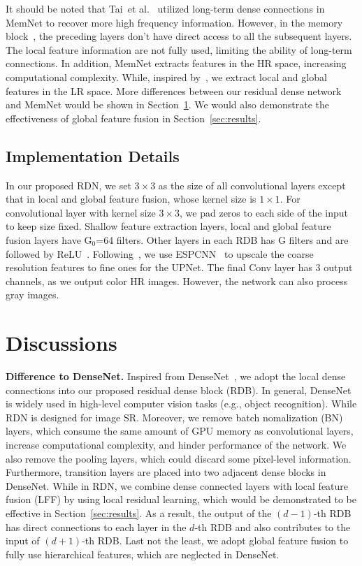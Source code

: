 \documentclass[10pt,twocolumn,letterpaper]{article}
\begin{document}
It should be noted that Tai~et al.~\cite{tai2017memnet} utilized long-term dense connections in MemNet to recover more high frequency information. However, in the memory block~\cite{tai2017memnet}, the preceding layers don't have direct access to all the subsequent layers. The local feature information are not fully used, limiting the ability of long-term connections. In addition, MemNet extracts features in the HR space, increasing computational complexity. While, inspired by~\cite{dong2016accelerating,shi2016real,lai2017deep,lim2017enhanced}, we extract local and global features in the LR space. More differences between our residual dense network and MemNet would be shown in Section~\ref{sec:discussions}. We would also demonstrate the effectiveness of global feature fusion in Section~\ref{sec:results}.

\subsection{Implementation Details}
\label{sec:implement}
In our proposed RDN, we set $3\times 3$ as the size of all convolutional layers except that in local and global feature fusion, whose kernel size is $1\times 1$. For convolutional layer with kernel size $3\times 3$, we pad zeros to each side of the input to keep size fixed. Shallow feature extraction layers, local and global feature fusion layers have G$_{0}$=64 filters. Other layers in each RDB has G filters and are followed by ReLU~\cite{glorot2011deep}. Following~\cite{lim2017enhanced}, we use ESPCNN~\cite{shi2016real} to upscale the coarse resolution features to fine ones for the UPNet. The final Conv layer has $3$ output channels, as we output color HR images. However, the network can also process gray images. 

\section{Discussions}
\label{sec:discussions}


\textbf{Difference to DenseNet.} Inspired from DenseNet~\cite{huang2017densely}, we adopt the local dense connections into our proposed residual dense block (RDB). In general, DenseNet is widely used in high-level computer vision tasks (e.g., object recognition). While RDN is designed for image SR. Moreover, we remove batch nomalization (BN) layers, which consume the same amount of GPU memory as convolutional layers, increase computational complexity, and hinder performance of the network. We also remove the pooling layers, which could discard some pixel-level information. Furthermore, transition layers are placed into two adjacent dense blocks in DenseNet. While in RDN, we combine dense connected layers with local feature fusion (LFF) by using local residual learning, which would be demonstrated to be effective in Section~\ref{sec:results}. As a result, the output of the $(d-1)$-th RDB has direct connections to each layer in the $d$-th RDB and also contributes to the input of $(d+1)$-th RDB. Last not the least, we adopt global feature fusion to fully use hierarchical features, which are neglected in DenseNet.  
\end{document}
